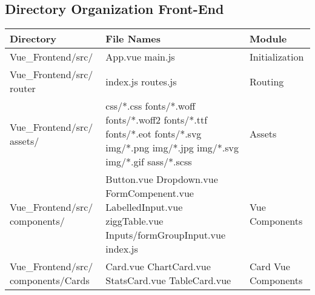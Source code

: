 \documentclass[conference]{IEEEtran}
\begin{document}
\subsection{Directory Organization Front-End}

\begin{table}[H]
\centering
\renewcommand{\arraystretch}{1.5}
\begin{tabular}{|m{2.6cm}|m{3.5cm}|m{1.6cm}|}
\hline
\textbf{Directory} & \textbf{File Names} & \textbf{Module} \\ \hline

Vue\_Frontend/src/  & 
App.vue \newline
main.js & 
Initialization \\ \hline

Vue\_Frontend/src/ router & 
index.js \newline
routes.js & 
Routing \\ \hline

Vue\_Frontend/src/ assets/ & 
css/*.css \newline
fonts/*.woff \newline
fonts/*.woff2 \newline
fonts/*.ttf \newline
fonts/*.eot \newline
fonts/*.svg \newline
img/*.png \newline
img/*.jpg \newline
img/*.svg \newline
img/*.gif \newline
sass/*.scss & 
Assets \\ \hline

Vue\_Frontend/src/  components/ & 
Button.vue \newline
Dropdown.vue \newline
FormCompenent.vue \newline
LabelledInput.vue \newline
ziggTable.vue \newline
Inputs/formGroupInput.vue \newline
index.js & 
Vue Components \\ \hline

Vue\_Frontend/src/ components/Cards & 
Card.vue \newline
ChartCard.vue \newline
StatsCard.vue \newline
TableCard.vue & 
Card Vue Components \\ \hline


\end{tabular}
\end{table}
\end{document}
